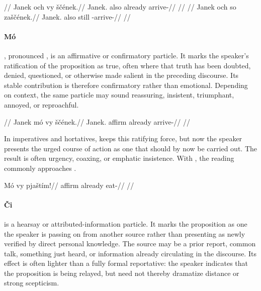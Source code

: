 \pex
\a
\begingl
\glpreamble {}//
\gla Janek och vy ščének.//
\glb Janek.\Dir{} also already arrive-\Pf{}//
\glft {}//
\endgl
\a
\begingl
\glpreamble {}//
\gla Janek och so zaščének.//
\glb Janek.\Dir{} also still \Neg{}-arrive-\Pf{}//
\glft {}//
\endgl
\xe

\paragraph{Mó} , pronounced \ipagloss{[ˈmoː]}, is an affirmative
or confirmatory particle. It marks
the speaker's ratification of the proposition as true, often where that truth
has been doubted, denied, questioned, or otherwise made salient in the
preceding discourse. Its stable contribution is therefore confirmatory rather
than emotional. Depending on context, the same particle may sound reassuring,
insistent, triumphant, annoyed, or reproachful.

\pex
\begingl
\glpreamble {}//
\gla Janek mó vy ščének.//
\glb Janek.\Dir{} affirm already arrive-\Pf{}//
\glft {}//
\endgl
\xe

In imperatives and hortatives,  keeps this ratifying force, but now
the speaker presents the urged course of action as one that should by now be
carried out. The result is often urgency, coaxing, or emphatic insistence.
With , the reading commonly approaches .

\pex
\begingl
\gla Mó vy pjaštím!//
\glb affirm already eat-\Imp{}//
\glft {}//
\endgl
\xe

\paragraph{Či}  is a hearsay or attributed-information particle. It
marks the proposition as one the speaker is passing on from another source
rather than presenting as newly verified by direct personal knowledge. The
source may be a prior report, common talk, something just heard, or information
already circulating in the discourse. Its effect is often lighter than a fully
formal reportative: the speaker indicates that the proposition is being relayed,
but need not thereby dramatize distance or strong scepticism.

